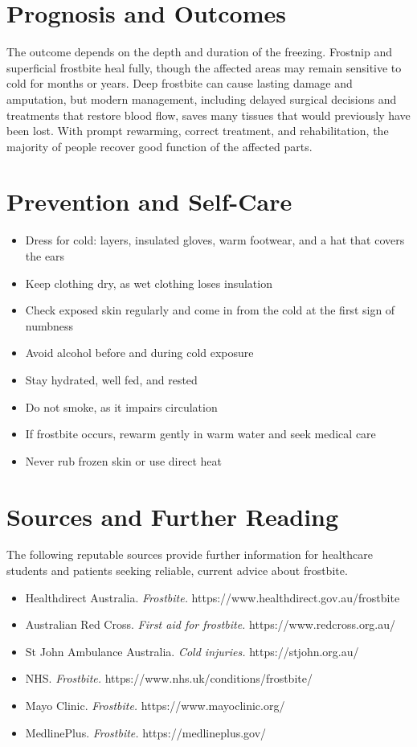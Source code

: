 \section*{Prognosis and Outcomes}
The outcome depends on the depth and duration of the freezing. Frostnip and superficial frostbite heal fully, though the affected areas may remain sensitive to cold for months or years. Deep frostbite can cause lasting damage and amputation, but modern management, including delayed surgical decisions and treatments that restore blood flow, saves many tissues that would previously have been lost. With prompt rewarming, correct treatment, and rehabilitation, the majority of people recover good function of the affected parts.

\section*{Prevention and Self-Care}
\begin{itemize}
    \item Dress for cold: layers, insulated gloves, warm footwear, and a hat that covers the ears
    \item Keep clothing dry, as wet clothing loses insulation
    \item Check exposed skin regularly and come in from the cold at the first sign of numbness
    \item Avoid alcohol before and during cold exposure
    \item Stay hydrated, well fed, and rested
    \item Do not smoke, as it impairs circulation
    \item If frostbite occurs, rewarm gently in warm water and seek medical care
    \item Never rub frozen skin or use direct heat
\end{itemize}

\section*{Sources and Further Reading}
The following reputable sources provide further information for healthcare students and patients seeking reliable, current advice about frostbite.
\begin{itemize}
    \item Healthdirect Australia. \textit{Frostbite.} https://www.healthdirect.gov.au/frostbite
    \item Australian Red Cross. \textit{First aid for frostbite.} https://www.redcross.org.au/
    \item St John Ambulance Australia. \textit{Cold injuries.} https://stjohn.org.au/
    \item NHS. \textit{Frostbite.} https://www.nhs.uk/conditions/frostbite/
    \item Mayo Clinic. \textit{Frostbite.} https://www.mayoclinic.org/
    \item MedlinePlus. \textit{Frostbite.} https://medlineplus.gov/
\end{itemize}
